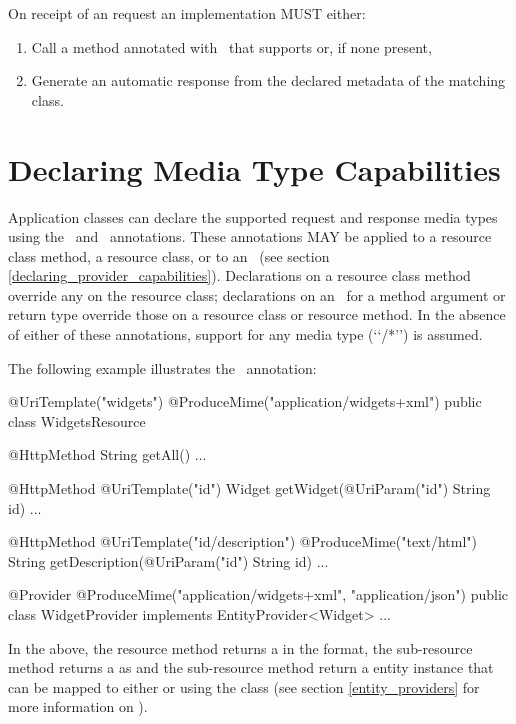 On receipt of an  request an implementation MUST either:

\begin{enumerate}
\item Call a method annotated with \HttpMethod\ that supports  or, if none present,
\item Generate an automatic response from the declared metadata of the matching class.
\end{enumerate}


\section{Declaring Media Type Capabilities}
\label{declaring_method_capabilities}

Application classes can declare the supported request and response media types using the \ProduceMime\ and \ConsumeMime\ annotations. These annotations MAY be applied to a resource class method, a resource class, or to an \EntityProvider\ (see section \ref{declaring_provider_capabilities}). Declarations on a resource class method override any on the resource class; declarations on an \EntityProvider\ for a method argument or return type override those on a resource class or resource method. In the absence of either of these annotations, support for any media type (\lq\lq*/*\rq\rq) is assumed.

The following example illustrates the \ProduceMime\ annotation:

\begin{listing}{1}
@UriTemplate("widgets")
@ProduceMime("application/widgets+xml")
public class WidgetsResource {
  
  @HttpMethod
  String getAll() {...}
  
  @HttpMethod
  @UriTemplate("{id}")
  Widget getWidget(@UriParam("id") String id) {...}

  @HttpMethod
  @UriTemplate("{id}/description")
  @ProduceMime("text/html")
  String getDescription(@UriParam("id") String id) {...}
}

@Provider
@ProduceMime({"application/widgets+xml", "application/json"})
public class WidgetProvider implements EntityProvider<Widget> {...}
\end{listing}

In the above, the  resource method returns a  in the  format, the  sub-resource method returns a  as  and the  sub-resource method return a  entity instance that can be mapped to either  or  using the  class (see section \ref{entity_providers} for more information on \EntityProvider).

